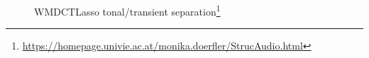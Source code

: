 \documentclass[report.tex]{subfiles}
\begin{document}
\begin{figure}[ht]
	\centering
        \begin{minipage}{1.\textwidth}
		\renewcommand\footnoterule{} %
		\renewcommand{\thempfootnote}{\fnsymbol{mpfootnote}}
		\centering
		\\
		\\
		\caption[WMDCTLasso tonal/transient separation]{WMDCTLasso tonal/transient separation\footnote[1]{\url{https://homepage.univie.ac.at/monika.doerfler/StrucAudio.html}}}
		\label{fig:wmdcttonaltranssep}
	\end{minipage}
\end{figure}
\end{document}
